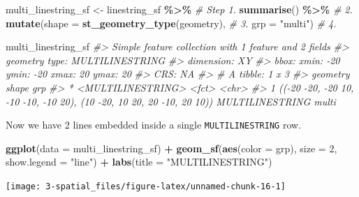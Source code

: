 \documentclass[
]{report}
\newenvironment{Shaded}{\begin{snugshade}}{\end{snugshade}}
\newcommand{\CommentTok}[1]{\textcolor[rgb]{0.56,0.35,0.01}{\textit{#1}}}
\newcommand{\DataTypeTok}[1]{\textcolor[rgb]{0.13,0.29,0.53}{#1}}
\newcommand{\DecValTok}[1]{\textcolor[rgb]{0.00,0.00,0.81}{#1}}
\newcommand{\KeywordTok}[1]{\textcolor[rgb]{0.13,0.29,0.53}{\textbf{#1}}}
\newcommand{\NormalTok}[1]{#1}
\newcommand{\OperatorTok}[1]{\textcolor[rgb]{0.81,0.36,0.00}{\textbf{#1}}}
\newcommand{\StringTok}[1]{\textcolor[rgb]{0.31,0.60,0.02}{#1}}
\begin{document}
\begin{Shaded}
\begin{Highlighting}[]
\NormalTok{multi\_linestring\_sf \textless{}{-}}\StringTok{ }\NormalTok{linestring\_sf }\OperatorTok{\%\textgreater{}\%}\StringTok{     }\CommentTok{\# Step 1.}
\StringTok{  }\KeywordTok{summarise}\NormalTok{() }\OperatorTok{\%\textgreater{}\%}\StringTok{                            }\CommentTok{\# 2.}
\StringTok{  }\KeywordTok{mutate}\NormalTok{(}\DataTypeTok{shape =} \KeywordTok{st\_geometry\_type}\NormalTok{(geometry), }\CommentTok{\# 3.}
         \DataTypeTok{grp =} \StringTok{"multi"}\NormalTok{)                      }\CommentTok{\# 4.}

\NormalTok{multi\_linestring\_sf}
\CommentTok{\#\textgreater{} Simple feature collection with 1 feature and 2 fields}
\CommentTok{\#\textgreater{} geometry type:  MULTILINESTRING}
\CommentTok{\#\textgreater{} dimension:      XY}
\CommentTok{\#\textgreater{} bbox:           xmin: {-}20 ymin: {-}20 xmax: 20 ymax: 20}
\CommentTok{\#\textgreater{} CRS:            NA}
\CommentTok{\#\textgreater{} \# A tibble: 1 x 3}
\CommentTok{\#\textgreater{}                                                               geometry shape           grp  }
\CommentTok{\#\textgreater{} *                                                    \textless{}MULTILINESTRING\textgreater{} \textless{}fct\textgreater{}           \textless{}chr\textgreater{}}
\CommentTok{\#\textgreater{} 1 (({-}20 {-}20, {-}20 10, {-}10 {-}10, {-}10 20), (10 {-}20, 10 20, 20 {-}10, 20 10)) MULTILINESTRING multi}
\end{Highlighting}
\end{Shaded}

Now we have 2 lines embedded inside a single \texttt{MULTILINESTRING} row.

\begin{Shaded}
\begin{Highlighting}[]
\KeywordTok{ggplot}\NormalTok{(}\DataTypeTok{data =}\NormalTok{ multi\_linestring\_sf) }\OperatorTok{+}\StringTok{ }
\StringTok{  }\KeywordTok{geom\_sf}\NormalTok{(}\KeywordTok{aes}\NormalTok{(}\DataTypeTok{color =}\NormalTok{ grp), }\DataTypeTok{size =} \DecValTok{2}\NormalTok{, }\DataTypeTok{show.legend =} \StringTok{"line"}\NormalTok{) }\OperatorTok{+}
\StringTok{  }\KeywordTok{labs}\NormalTok{(}\DataTypeTok{title =} \StringTok{"MULTILINESTRING"}\NormalTok{)}
\end{Highlighting}
\end{Shaded}

\begin{center}\texttt{[image: 3-spatial\_files/figure-latex/unnamed-chunk-16-1]} \end{center}
\end{document}
